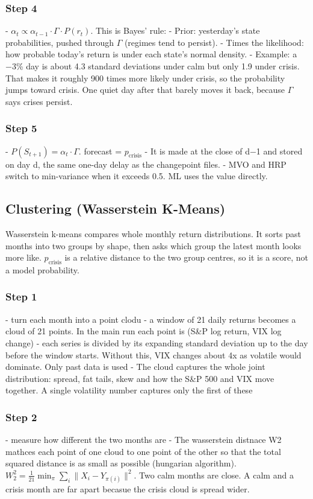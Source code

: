 \documentclass[12pt]{article}
\begin{document}
\subsubsection{Step 4}
- $\alpha_t \propto \alpha_{t-1} \cdot \Gamma \cdot P(r_t)$. This is Bayes’ rule:
- Prior: yesterday’s state probabilities, pushed through $\Gamma$ (regimes tend to persist).
- Times the likelihood: how probable today’s return is under each state’s normal density.
- Example: a −3\% day is about 4.3 standard deviations under calm but only 1.9 under crisis. That makes it 
roughly 900 times more likely under crisis, so the probability jumps toward crisis. One quiet day after that 
barely moves it back, because $\Gamma$ says crises persist.
\subsubsection{Step 5}
- $P(S_{t+1}) = \alpha_t \cdot \Gamma$. forecast = $p_{\text{crisis}}$
- It is made at the close of d−1 and stored on day d, the same one-day delay as the changepoint files.
- MVO and HRP switch to min-variance when it exceeds 0.5. ML uses the value directly.

\subsection{Clustering (Wasserstein K-Means)}
Wasserstein k-means compares whole monthly return distributions. It sorts past months into two groups by shape, 
then asks which group the latest month looks more like. $p_{\text{crisis}}$ is a relative distance to the two group centres, so 
it is a score, not a model probability.
\subsubsection{Step 1}
- turn each month into a point clodu
- a window of 21 daily returns becomes a cloud of 21 points. In the main run each point is (S\&P log return, VIX
log change)
- each series is divided by its expanding standard deviation up to the day before the window starts. Without this, 
VIX changes about 4x as volatile would dominate. Only past data is used
- The cloud captures the whole joint distribution: spread, fat tails, skew and how the S\&P 500 and VIX move together.
A single volatility number captures only the first of these
\subsubsection{Step 2}
- measure how different the two months are
- The wasserstein distnace W2 mathces each point of one cloud to one point of the other so that the total squared 
distance is as small as possible (hungarian algorithm). $W_2^2 = \frac{1}{21} \min_\pi \sum_i \lVert X_i - Y_{\pi(i)} \rVert^2$. 
Two calm months are close. A calm and a crisis month are far apart becasue the crisis cloud is spread wider. 
\end{document}
